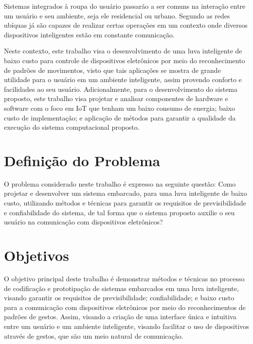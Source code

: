 Sistemas integrados à roupa do usuário passarão a ser comuns na interação entre um usuário e seu ambiente, seja ele residencial ou urbano. Segundo  as redes ubíquas já são capazes de realizar certas operações em um contexto onde diversos dispositivos inteligentes estão em constante comunicação.  


Neste contexto, este trabalho visa o desenvolvimento de uma luva inteligente de baixo custo para controle de dispositivos eletrônicos por meio do reconhecimento de padrões de movimentos, visto que tais aplicações se mostra de grande utilidade para o usuário em um ambiente inteligente, assim provendo conforto e facilidades ao seu usuário. Adicionalmente, para o desenvolvimento do sistema proposto, este trabalho visa projetar e analisar componentes de hardware e software com o foco em IoT que tenham um baixo consumo de energia; baixo custo de implementação; e aplicação de métodos para garantir a qualidade da execução do sistema computacional proposto.


\section{Definição do Problema}

O problema considerado neste trabalho é expresso na seguinte questão: Como projetar e desenvolver um sistema embarcado, para uma luva inteligente de baixo custo, utilizando métodos e técnicas para garantir os requisitos de previsibilidade e confiabilidade do sistema, de tal forma que o sistema proposto auxilie o seu usuário na comunicação com dispositivos eletrônicos?




\section{Objetivos}

O objetivo principal deste trabalho é demonstrar métodos e técnicas no processo de codificação e prototipação de sistemas embarcados em uma luva inteligente, visando garantir os requisitos de previsibilidade; confiabilidade; e baixo custo para a comunicação com dispositivos eletrônicos por meio do reconhecimentos de padrões de gestos. Assim, visando a criação de uma interface única e intuitiva entre um usuário e um ambiente inteligente, visando facilitar o uso de dispositivos através de gestos, que são um meio natural de comunicação.



